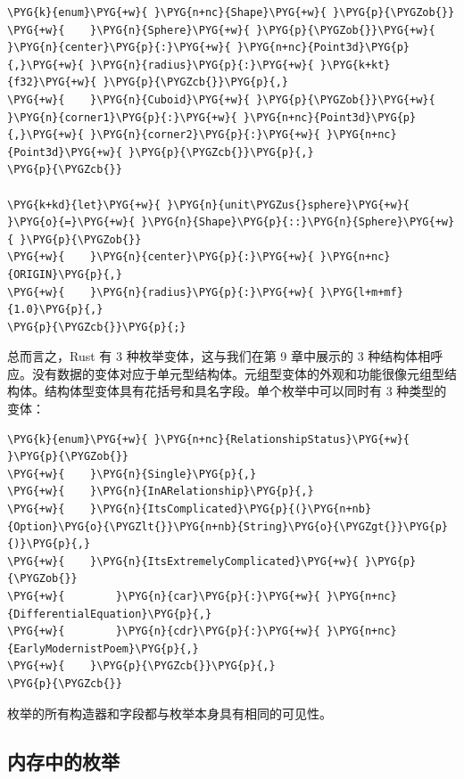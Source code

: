\begin{Verbatim}[commandchars=\\\{\},breaklines=true,breakanywhere=true,fontsize=\codefont,xleftmargin=17bp]
\PYG{k}{enum}\PYG{+w}{ }\PYG{n+nc}{Shape}\PYG{+w}{ }\PYG{p}{\PYGZob{}}
\PYG{+w}{    }\PYG{n}{Sphere}\PYG{+w}{ }\PYG{p}{\PYGZob{}}\PYG{+w}{ }\PYG{n}{center}\PYG{p}{:}\PYG{+w}{ }\PYG{n+nc}{Point3d}\PYG{p}{,}\PYG{+w}{ }\PYG{n}{radius}\PYG{p}{:}\PYG{+w}{ }\PYG{k+kt}{f32}\PYG{+w}{ }\PYG{p}{\PYGZcb{}}\PYG{p}{,}
\PYG{+w}{    }\PYG{n}{Cuboid}\PYG{+w}{ }\PYG{p}{\PYGZob{}}\PYG{+w}{ }\PYG{n}{corner1}\PYG{p}{:}\PYG{+w}{ }\PYG{n+nc}{Point3d}\PYG{p}{,}\PYG{+w}{ }\PYG{n}{corner2}\PYG{p}{:}\PYG{+w}{ }\PYG{n+nc}{Point3d}\PYG{+w}{ }\PYG{p}{\PYGZcb{}}\PYG{p}{,}
\PYG{p}{\PYGZcb{}}

\PYG{k+kd}{let}\PYG{+w}{ }\PYG{n}{unit\PYGZus{}sphere}\PYG{+w}{ }\PYG{o}{=}\PYG{+w}{ }\PYG{n}{Shape}\PYG{p}{::}\PYG{n}{Sphere}\PYG{+w}{ }\PYG{p}{\PYGZob{}}
\PYG{+w}{    }\PYG{n}{center}\PYG{p}{:}\PYG{+w}{ }\PYG{n+nc}{ORIGIN}\PYG{p}{,}
\PYG{+w}{    }\PYG{n}{radius}\PYG{p}{:}\PYG{+w}{ }\PYG{l+m+mf}{1.0}\PYG{p}{,}
\PYG{p}{\PYGZcb{}}\PYG{p}{;}
\end{Verbatim}

总而言之，Rust 有 3 种枚举变体，这与我们在第 9 章中展示的 3 种结构体相呼应。没有数据的变体对应于单元型结构体。元组型变体的外观和功能很像元组型结构体。结构体型变体具有花括号和具名字段。单个枚举中可以同时有 3 种类型的变体：

\begin{Verbatim}[commandchars=\\\{\},breaklines=true,breakanywhere=true,fontsize=\codefont,xleftmargin=17bp]
\PYG{k}{enum}\PYG{+w}{ }\PYG{n+nc}{RelationshipStatus}\PYG{+w}{ }\PYG{p}{\PYGZob{}}
\PYG{+w}{    }\PYG{n}{Single}\PYG{p}{,}
\PYG{+w}{    }\PYG{n}{InARelationship}\PYG{p}{,}
\PYG{+w}{    }\PYG{n}{ItsComplicated}\PYG{p}{(}\PYG{n+nb}{Option}\PYG{o}{\PYGZlt{}}\PYG{n+nb}{String}\PYG{o}{\PYGZgt{}}\PYG{p}{)}\PYG{p}{,}
\PYG{+w}{    }\PYG{n}{ItsExtremelyComplicated}\PYG{+w}{ }\PYG{p}{\PYGZob{}}
\PYG{+w}{        }\PYG{n}{car}\PYG{p}{:}\PYG{+w}{ }\PYG{n+nc}{DifferentialEquation}\PYG{p}{,}
\PYG{+w}{        }\PYG{n}{cdr}\PYG{p}{:}\PYG{+w}{ }\PYG{n+nc}{EarlyModernistPoem}\PYG{p}{,}
\PYG{+w}{    }\PYG{p}{\PYGZcb{}}\PYG{p}{,}
\PYG{p}{\PYGZcb{}}
\end{Verbatim}

枚举的所有构造器和字段都与枚举本身具有相同的可见性。

\subsection{内存中的枚举}

